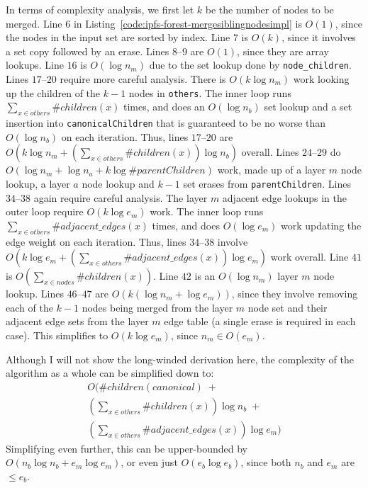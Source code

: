 In terms of complexity analysis, we first let $k$ be the number of nodes to be merged. Line $6$ in Listing~\ref{code:ipfs-forest-mergesiblingnodesimpl} is $O(1)$, since the nodes in the input set are sorted by index. Line $7$ is $O(k)$, since it involves a set copy followed by an erase. Lines $8$--$9$ are $O(1)$, since they are array lookups. Line $16$ is $O(\log n_m)$ due to the set lookup done by \texttt{node_children}. Lines $17$--$20$ require more careful analysis. There is $O(k \log n_m)$ work looking up the children of the $k-1$ nodes in \texttt{others}. The inner loop runs $\sum_{x \in \mathit{others}} \#children(x)$ times, and does an $O(\log n_b)$ set lookup and a set insertion into \texttt{canonicalChildren} that is guaranteed to be no worse than $O(\log n_b)$ on each iteration. Thus, lines $17$--$20$ are $O(k \log n_m + (\sum_{x \in \mathit{others}} \#\mathit{children}(x)) \log n_b)$ overall. Lines $24$--$29$ do $O(\log n_m + \log n_a + k \log \#\mathit{parentChildren})$ work, made up of a layer $m$ node lookup, a layer $a$ node lookup and $k-1$ set erases from \texttt{parentChildren}. Lines $34$--$38$ again require careful analysis. The layer $m$ adjacent edge lookups in the outer loop require $O(k \log e_m)$ work. The inner loop runs $\sum_{x \in \mathit{others}} \#\mathit{adjacent\_edges}(x)$ times, and does $O(\log e_m)$ work updating the edge weight on each iteration. Thus, lines $34$--$38$ involve $O(k \log e_m + (\sum_{x \in \mathit{others}} \#\mathit{adjacent\_edges}(x)) \log e_m)$ work overall. Line $41$ is $O(\sum_{x \in \mathit{nodes}} \#\mathit{children}(x))$. Line $42$ is an $O(\log n_m)$ layer $m$ node lookup. Lines $46$--$47$ are $O(k(\log n_m + \log e_m))$, since they involve removing each of the $k-1$ nodes being merged from the layer $m$ node set and their adjacent edge sets from the layer $m$ edge table (a single erase is required in each case). This simplifies to $O(k \log e_m)$, since $n_m \in O(e_m)$.

Although I will not show the long-winded derivation here, the complexity of the algorithm as a whole can be simplified down to:
%
\begin{eqnarray*}
O(\#children(\mathit{canonical}) \; + \\
\left(\sum_{x \in others} \#\mathit{children}(x)\right) \log n_b \; + \\
\left(\sum_{x \in \mathit{others}} \#\mathit{adjacent\_edges}(x)\right) \log e_m)
\end{eqnarray*}
%
Simplifying even further, this can be upper-bounded by $O(n_b \log n_b + e_m \log e_m)$, or even just $O(e_b \log e_b)$, since both $n_b$ and $e_m$ are $\le e_b$.


